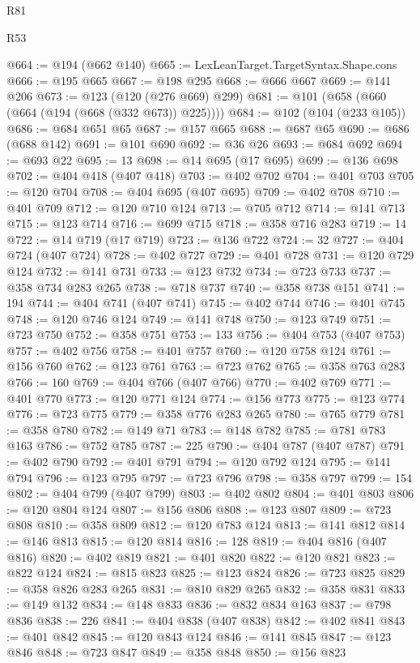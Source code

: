 \begin{lexlean}{R81}
\begin{lexlean}{R53}
\begin{coremodule}
{{{{{{{{{{{{{{{{{{{{{{{{{{{{{{{{{{{{{{{{{{{{{{{{{{{{{{{{{{{{{{{{{{{{{{{{{{{{{{{{{{{{{{{{{{{{{{{{{{{{{{{{{{{{{{{{@664 := @194 (@662 @140)
@665 := LexLeanTarget.TargetSyntax.Shape.cons
@666 := @195 @665
@667 := @198 @295
@668 := @666 @667
@669 := @141 @206
@673 := @123 (@120 (@276 @669) @299)
@681 := @101 (@658 (@660 (@664 (@194 (@668 (@332 @673)) @225))))
@684 := @102 (@104 (@233 @105))
@686 := @684 @651 @65
@687 := @157 @665
@688 := @687 @65
@690 := @686 (@688 @142)
@691 := @101 @690
@692 := @36 @26
@693 := @684 @692
@694 := @693 @22
@695 := 13
@698 := @14 @695 (@17 @695)
@699 := @136 @698
@702 := @404 @418 (@407 @418)
@703 := @402 @702
@704 := @401 @703
@705 := @120 @704
@708 := @404 @695 (@407 @695)
@709 := @402 @708
@710 := @401 @709
@712 := @120 @710 @124
@713 := @705 @712
@714 := @141 @713
@715 := @123 @714
@716 := @699 @715
@718 := @358 @716 @283
@719 := 14
@722 := @14 @719 (@17 @719)
@723 := @136 @722
@724 := 32
@727 := @404 @724 (@407 @724)
@728 := @402 @727
@729 := @401 @728
@731 := @120 @729 @124
@732 := @141 @731
@733 := @123 @732
@734 := @723 @733
@737 := @358 @734 @283 @265
@738 := @718 @737
@740 := @358 @738 @151
@741 := 194
@744 := @404 @741 (@407 @741)
@745 := @402 @744
@746 := @401 @745
@748 := @120 @746 @124
@749 := @141 @748
@750 := @123 @749
@751 := @723 @750
@752 := @358 @751
@753 := 133
@756 := @404 @753 (@407 @753)
@757 := @402 @756
@758 := @401 @757
@760 := @120 @758 @124
@761 := @156 @760
@762 := @123 @761
@763 := @723 @762
@765 := @358 @763 @283
@766 := 160
@769 := @404 @766 (@407 @766)
@770 := @402 @769
@771 := @401 @770
@773 := @120 @771 @124
@774 := @156 @773
@775 := @123 @774
@776 := @723 @775
@779 := @358 @776 @283 @265
@780 := @765 @779
@781 := @358 @780
@782 := @149 @71
@783 := @148 @782
@785 := @781 @783 @163
@786 := @752 @785
@787 := 225
@790 := @404 @787 (@407 @787)
@791 := @402 @790
@792 := @401 @791
@794 := @120 @792 @124
@795 := @141 @794
@796 := @123 @795
@797 := @723 @796
@798 := @358 @797
@799 := 154
@802 := @404 @799 (@407 @799)
@803 := @402 @802
@804 := @401 @803
@806 := @120 @804 @124
@807 := @156 @806
@808 := @123 @807
@809 := @723 @808
@810 := @358 @809
@812 := @120 @783 @124
@813 := @141 @812
@814 := @146 @813
@815 := @120 @814
@816 := 128
@819 := @404 @816 (@407 @816)
@820 := @402 @819
@821 := @401 @820
@822 := @120 @821
@823 := @822 @124
@824 := @815 @823
@825 := @123 @824
@826 := @723 @825
@829 := @358 @826 @283 @265
@831 := @810 @829 @265
@832 := @358 @831
@833 := @149 @132
@834 := @148 @833
@836 := @832 @834 @163
@837 := @798 @836
@838 := 226
@841 := @404 @838 (@407 @838)
@842 := @402 @841
@843 := @401 @842
@845 := @120 @843 @124
@846 := @141 @845
@847 := @123 @846
@848 := @723 @847
@849 := @358 @848
@850 := @156 @823
}}}}}}}}}}}}}}}}}}}}}}}}}}}}}}}}}}}}}}}}}}}}}}}}}}}}}}}}}}}}}}}}}}}}}}}}}}}}}}}}}}}}}}}}}}}}}}}}}}}}}}}}}}}}}}}}
\end{coremodule}
\end{lexlean}
\end{lexlean}
